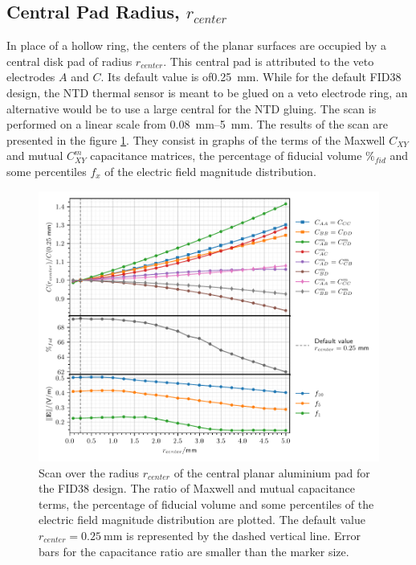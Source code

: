 \subsection{Central Pad Radius, $r_{center}$}

In place of a hollow ring, the centers of the planar surfaces are occupied by a central disk pad of radius $r_{center}$. This central pad is attributed to the veto electrodes $A$ and $C$. Its default value is of\SI{0.25}{\mm}. While for the default FID38 design, the NTD thermal sensor is meant to be glued on a veto electrode ring, an alternative would be to use a large central for the NTD gluing. The scan is performed on a linear scale from \SIrange{0.08}{5}{\mm}. The results of the scan are presented in the figure \ref{fig:capacitance-fiducial-r-center}. They consist in graphs of the terms of the Maxwell $C_{XY}$ and mutual $C_{XY}^m$ capacitance matrices, the percentage of fiducial volume $\%_{fid}$ and some percentiles $f_x$ of the electric field magnitude distribution.

\begin{figure}
\centering
\includegraphics[scale=1]{Figures/ElectrodesScan/capacitance_fiducial_r_center.pdf}
\caption{Scan over the radius $r_{center}$ of the central planar aluminium pad for the FID38 design. The ratio of Maxwell and mutual capacitance terms, the percentage of fiducial volume and some percentiles of the electric field magnitude distribution are plotted. The default value $r_{center}=\SI{0.25}{\mm}$ is represented by the dashed vertical line. Error bars for the capacitance ratio are smaller than the marker size.}
\label{fig:capacitance-fiducial-r-center}
\end{figure}

